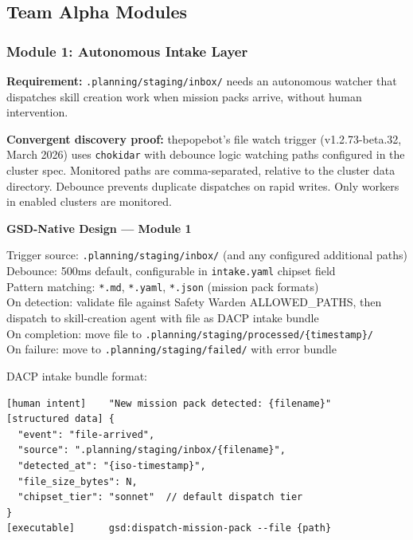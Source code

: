 \documentclass[11pt,letterpaper]{article}
\begin{document}
\subsection{Team Alpha Modules}

\subsubsection{Module 1: Autonomous Intake Layer}

\textbf{Requirement:} \texttt{.planning/staging/inbox/} needs an autonomous watcher that dispatches skill creation work when mission packs arrive, without human intervention.

\textbf{Convergent discovery proof:} thepopebot's file watch trigger (v1.2.73-beta.32, March 2026) uses \texttt{chokidar} with debounce logic watching paths configured in the cluster spec. Monitored paths are comma-separated, relative to the cluster data directory. Debounce prevents duplicate dispatches on rapid writes. Only workers in enabled clusters are monitored.

\begin{implbox}
\textbf{GSD-Native Design --- Module 1}

Trigger source: \texttt{.planning/staging/inbox/} (and any configured additional paths)\\
Debounce: 500ms default, configurable in \texttt{intake.yaml} chipset field\\
Pattern matching: \texttt{*.md}, \texttt{*.yaml}, \texttt{*.json} (mission pack formats)\\
On detection: validate file against Safety Warden ALLOWED\_PATHS, then dispatch to skill-creation agent with file as DACP intake bundle\\
On completion: move file to \texttt{.planning/staging/processed/\{timestamp\}/}\\
On failure: move to \texttt{.planning/staging/failed/} with error bundle

DACP intake bundle format:
\begin{verbatim}
[human intent]    "New mission pack detected: {filename}"
[structured data] {
  "event": "file-arrived",
  "source": ".planning/staging/inbox/{filename}",
  "detected_at": "{iso-timestamp}",
  "file_size_bytes": N,
  "chipset_tier": "sonnet"  // default dispatch tier
}
[executable]      gsd:dispatch-mission-pack --file {path}
\end{verbatim}
\end{implbox}
\end{document}
